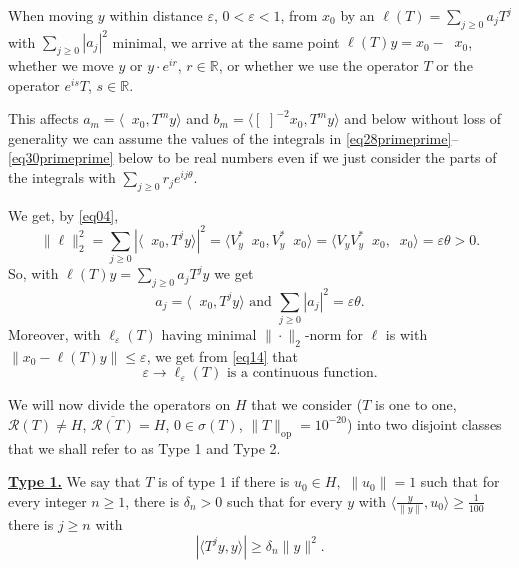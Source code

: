 \documentclass[12pt,oneside,reqno]{amsart}
\theoremstyle{definition}
\DeclareMathOperator*{\VV}{[\,\, ]^{-1}}
\begin{document}
When moving $y$ within distance $\varepsilon$, $0<\varepsilon <1$, from $x_0$ by an $\ell (T) =  \sum_{j \ge 0} a_j T^j$ with $\sum_{j \ge 0} |a_j|^2$ minimal, we arrive at the same point $\ell (T) y = x_0 - \VV x_0$, whether we move $y$ or  $y \cdot e^{ir}$, $r \in \mathbb{R}$, or whether we use the operator $T$ or the operator $ e^{is} T $, $s \in \mathbb{R}$.

This affects $a_m = \langle \VV x_0, T^m y \rangle$ and $b_m = \langle [ \,\, ]^{-2} x_0, T^m y \rangle$ and below without loss of generality we can assume the values of the integrals in \eqref{eq28primeprime}--\eqref{eq30primeprime} below to be real numbers even if we just consider the parts of the integrals with $\displaystyle \sum_{j \ge 0} r_j e^{i j \theta}$.


We get, by \eqref{eq04}, 
\begin{equation}\label{eq16}
\|\ell\|^2_2 = \sum_{j \ge 0} \left| \langle \VV x_0, T^j y\rangle\right|^2 = \langle V_y^* \VV x_0, V_y^* \VV x_0 \rangle = \langle V_y V_y^* \VV x_0, \VV x_0\rangle = \varepsilon \theta > 0.
\end{equation}
So, with $\ell(T) y = \sum_{j \ge 0} a_j T^jy$ we get 
\begin{equation}\label{eq17}
a_j = \langle \VV x_0, T^j y\rangle \text{ and } \sum_{j \ge 0} |a_j|^2 = \varepsilon \theta .
\end{equation}
Moreover, with $\ell_{\varepsilon}(T)$ having minimal $\|\cdot\|_2$-norm for $\ell$ is with $\|x_0 - \ell(T) y\| \le \varepsilon$, we get from \eqref{eq14} that  
\begin{equation}\label{eq18}
\varepsilon \rightarrow \ell_{\varepsilon} (T) \text{ is a continuous function.}
\end{equation}


We will now divide the operators on $H$ that we consider ($T$ is one to one, $\mathcal{R}(T)  \neq H$, $\overline{\mathcal{R}(T)}=H$, $0 \in \sigma (T)$,  $\|T\|_{\text{op}} = 10^{-20}$) into two disjoint classes that we shall refer to as Type 1 and Type 2.
\bigskip 

\noindent \textbf{\underline{Type 1.}}  We say that $T$ is of type 1 if there is $u_0 \in H, $ $\|u_0\| = 1$ such that for every integer $n\ge 1$, there is $\delta_n > 0$ such that for every $y$ with $\displaystyle \langle \frac{y}{\|y\|}, u_0 \rangle \ge \frac{1}{100}$ there is $j \ge n$ with
\begin{equation}\label{eq19}
	\left| \langle T^j y, y\rangle\right| \ge \delta_n \|y\|^2.
\end{equation}
\end{document}
